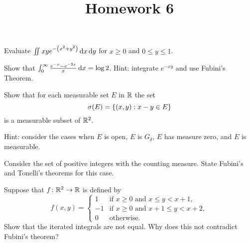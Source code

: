 \documentclass{../homework}
\title{Homework 6}
\author{}
\date{}
\begin{document}
\begin{problems}
\item
  \begin{problems}
  \item Evaluate \(\iint xy e^{-\prn*{x^2+y^2}} \dif x \dif y\) for
    \(x \ge 0\) and \(0 \le y \le 1\).

    \begin{solution}
    \end{solution}

  \item Show that
    \(\int_0^\infty \frac{e^{-x} - e^{-2x}}{x} \dif x = \log 2\).
    Hint: integrate \(e^{-xy}\) and use Fubini's Theorem.

    \begin{solution}
    \end{solution}

  \end{problems}

\item Show that for each measurable set \(E\) in \(\RR\) the set
  \[
    \sigma(E) = \set*{(x, y) : x-y \in E}
  \]
  is a measurable subset of \(\RR^2\).

  Hint: consider the cases when \(E\) is open, \(E\) is \(G_\delta\),
  \(E\) has measure zero, and \(E\) is measurable.

  \begin{solution}
  \end{solution}

\item Consider the set of positive integers with the counting measure.
  State Fubini's and Tonelli's theorems for this case.

  \begin{solution}
  \end{solution}

\item Suppose that \(f \colon \RR^2 \to \RR\) is defined by
  \[
    f(x, y) =
    \begin{cases}
      1 & \text{if \(x \ge 0\) and \(x \le y < x+1\)}, \\
      -1 & \text{if \(x \ge 0\) and \(x + 1 \le y < x+2\)}, \\
      0 & \text{otherwise}.
    \end{cases}
  \]
  Show that the iterated integrals are not equal.  Why does this not
  contradict Fubini's theorem?

  \begin{solution}
  \end{solution}


\end{problems}
\end{document}
